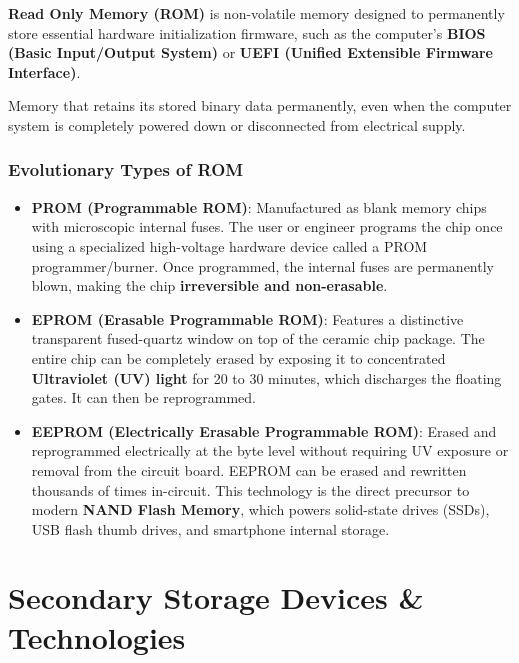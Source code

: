 \textbf{Read Only Memory (ROM)} is non-volatile memory designed to permanently store essential hardware initialization firmware, such as the computer's \textbf{BIOS (Basic Input/Output System)} or \textbf{UEFI (Unified Extensible Firmware Interface)}.

\begin{definition}
Memory that retains its stored binary data permanently, even when the computer system is completely powered down or disconnected from electrical supply.
\end{definition}

\subsubsection{Evolutionary Types of ROM}
\begin{itemize}[leftmargin=1.5em]
    \item \textbf{PROM (Programmable ROM)}: Manufactured as blank memory chips with microscopic internal fuses. The user or engineer programs the chip once using a specialized high-voltage hardware device called a PROM programmer/burner. Once programmed, the internal fuses are permanently blown, making the chip \textbf{irreversible and non-erasable}.
    \item \textbf{EPROM (Erasable Programmable ROM)}: Features a distinctive transparent fused-quartz window on top of the ceramic chip package. The entire chip can be completely erased by exposing it to concentrated \textbf{Ultraviolet (UV) light} for 20 to 30 minutes, which discharges the floating gates. It can then be reprogrammed.
    \item \textbf{EEPROM (Electrically Erasable Programmable ROM)}: Erased and reprogrammed electrically at the byte level without requiring UV exposure or removal from the circuit board. EEPROM can be erased and rewritten thousands of times in-circuit. This technology is the direct precursor to modern \textbf{NAND Flash Memory}, which powers solid-state drives (SSDs), USB flash thumb drives, and smartphone internal storage.
\end{itemize}

\section{Secondary Storage Devices \& Technologies}


